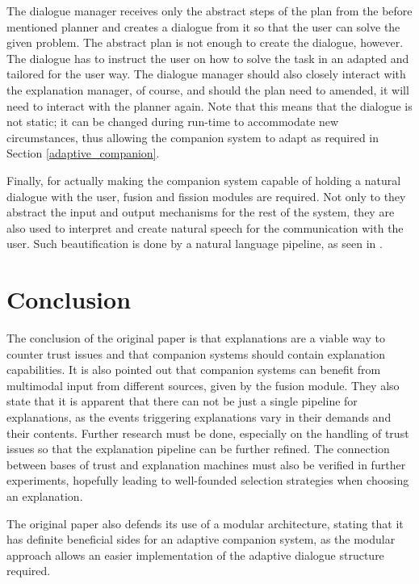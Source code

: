 \documentclass[a4paper]{article}
\begin{document}
The dialogue manager receives only the abstract steps of the plan from the before mentioned planner and creates a dialogue from it so that the user can solve the given problem. The abstract plan is not enough to create the dialogue, however. The dialogue has to instruct the user on how to solve the task in an adapted and tailored for the user way. The dialogue manager should also closely interact with the explanation manager, of course, and should the plan need to amended, it will need to interact with the planner again. Note that this means that the dialogue is not static; it can be changed during run-time to accommodate new circumstances, thus allowing the companion system to adapt as required in Section \ref{adaptive_companion}.

Finally, for actually making the companion system capable of holding a natural dialogue with the user, fusion and fission modules are required. Not only to they abstract the input and output mechanisms for the rest of the system, they are also used to interpret and create natural speech for the communication with the user. Such beautification is done by a natural language pipeline, as seen in \cite{reiter2000building}.

\section{Conclusion}

The conclusion of the original paper is that explanations are a viable way to counter trust issues and that companion systems should contain explanation capabilities. It is also pointed out that companion systems can benefit from multimodal input from different sources, given by the fusion module. They also state that it is apparent that there can not be just a single pipeline for explanations, as the events triggering explanations vary in their demands and their contents. Further research must be done, especially on the handling of trust issues so that the explanation pipeline can be further refined. The connection between bases of trust and explanation machines must also be verified in further experiments, hopefully leading to well-founded selection strategies when choosing an explanation.

The original paper also defends its use of a modular architecture, stating that it has definite beneficial sides for an adaptive companion system, as the modular approach allows an easier implementation of the adaptive dialogue structure required.
\end{document}
